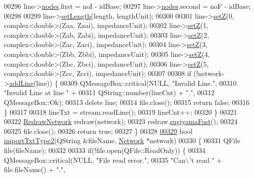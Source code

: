 \begin{DoxyCode}
00296     line->\hyperlink{class_line_afd17c40d656e6a8d677cb22df5f0c70b}{nodes}.first = noI - idBase;
00297     line->\hyperlink{class_line_afd17c40d656e6a8d677cb22df5f0c70b}{nodes}.second = noF - idBase;
00298 
00299     line->\hyperlink{group___models_ga950d0b8f5d167eda430c65ca7adadbb0}{setLength}(length, lengthUnit);
00300 
00301     line->\hyperlink{group___models_ga409df7d11f5c5d594a13fb2f74b3b9e0}{setZ}(0, complex<double>(Zaa, Zaai), impedanceUnit);
00302     line->\hyperlink{group___models_ga409df7d11f5c5d594a13fb2f74b3b9e0}{setZ}(1, complex<double>(Zab, Zabi), impedanceUnit);
00303     line->\hyperlink{group___models_ga409df7d11f5c5d594a13fb2f74b3b9e0}{setZ}(2, complex<double>(Zac, Zaci), impedanceUnit);
00304     line->\hyperlink{group___models_ga409df7d11f5c5d594a13fb2f74b3b9e0}{setZ}(3, complex<double>(Zbb, Zbbi), impedanceUnit);
00305     line->\hyperlink{group___models_ga409df7d11f5c5d594a13fb2f74b3b9e0}{setZ}(4, complex<double>(Zbc, Zbci), impedanceUnit);
00306     line->\hyperlink{group___models_ga409df7d11f5c5d594a13fb2f74b3b9e0}{setZ}(5, complex<double>(Zcc, Zcci), impedanceUnit);
00307 
00308     \textcolor{keywordflow}{if} (!network->\hyperlink{group___graphics_gae02945131494987b3ff9b59b627719b4}{addLine}(line)) \{
00309       QMessageBox::critical(NULL, \textcolor{stringliteral}{"Invalid Line."},
00310                             \textcolor{stringliteral}{"Invalid Line at line "} +
00311                             QString::number(lineCnt) + \textcolor{stringliteral}{"."},
00312                             QMessageBox::Ok);
00313       \textcolor{keyword}{delete} line;
00314       file.close();
00315       \textcolor{keywordflow}{return} \textcolor{keyword}{false};
00316     \}
00317 
00318     lineTxt = stream.readLine();
00319     lineCnt++;
00320   \}
00321 
00322   \hyperlink{class_redraw_network}{RedrawNetwork} redraw(network);
00323   redraw.\hyperlink{class_redraw_network_a94d53ddf8ee00c4ef6d56bb988333103}{sugiyamaFast}();
00324 
00325   file.close();
00326   \textcolor{keywordflow}{return} \textcolor{keyword}{true};
00327 \}
00328 
\hypertarget{import_8cpp_source_l00329}{}\hyperlink{import_8h_aef466de21b145a0fdf215dd1a6409924}{00329} \textcolor{keywordtype}{bool} \hyperlink{import_8cpp_aef466de21b145a0fdf215dd1a6409924}{importTxtType2}(QString &fileName, \hyperlink{class_network}{Network} *network)
00330 \{
00331   QFile file(fileName);
00332 
00333   \textcolor{keywordflow}{if}(!file.open(QFile::ReadOnly)) \{
00334     QMessageBox::critical(NULL, \textcolor{stringliteral}{"File read error."},
00335                           \textcolor{stringliteral}{"Can\(\backslash\)'t read "} + file.fileName() + \textcolor{stringliteral}{"."},

\end{DoxyCode}
